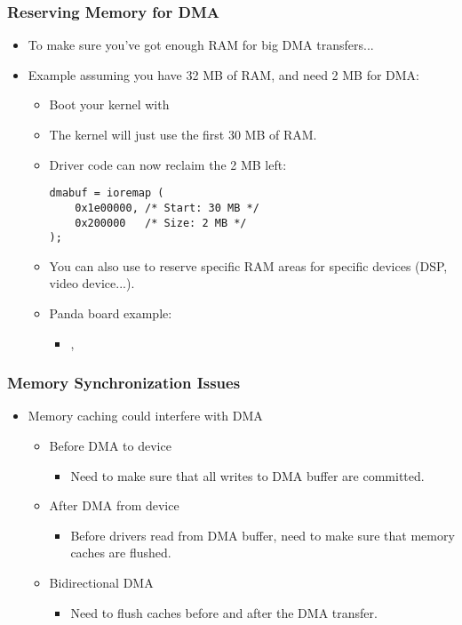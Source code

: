 \begin{frame}[fragile]
  \frametitle{Reserving Memory for DMA}
  \begin{itemize}
  \item To make sure you've got enough RAM for big DMA transfers...
  \item Example assuming you have 32 MB of RAM, and need 2 MB for DMA:
    \begin{itemize}
    \item Boot your kernel with 
    \item The kernel will just use the first 30 MB of RAM.
    \item Driver code can now reclaim the 2 MB left:
      \begin{verbatim}
dmabuf = ioremap (
    0x1e00000, /* Start: 30 MB */
    0x200000   /* Size: 2 MB */
);
      \end{verbatim}
    \item You can also use  to reserve specific RAM areas
      for specific devices
      (DSP, video device...).
    \item Panda board example:
      \begin{itemize}
      \item {}, 
      \end{itemize}
    \end{itemize}
  \end{itemize}
\end{frame}

\begin{frame}
  \frametitle{Memory Synchronization Issues}
  \begin{itemize}
  \item Memory caching could interfere with DMA
    \begin{itemize}
    \item Before DMA to device
      \begin{itemize}
      \item Need to make sure that all writes to DMA buffer are
        committed.
      \end{itemize}
    \item After DMA from device
      \begin{itemize}
      \item Before drivers read from DMA buffer, need to make sure
        that memory caches are flushed.
      \end{itemize}
    \item Bidirectional DMA
      \begin{itemize}
      \item Need to flush caches before and after the DMA transfer.
      \end{itemize}
    \end{itemize}
  \end{itemize}
\end{frame}

